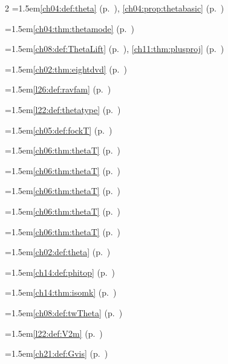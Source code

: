 \begin{multicols}{2}
\hangindent=1.5em\quad \ref{ch04:def:theta} (p.~\pageref{ch04:def:theta}), \ref{ch04:prop:thetabasic} (p.~\pageref{ch04:prop:thetabasic})\par
\hangindent=1.5em\quad \ref{ch04:thm:thetamode} (p.~\pageref{ch04:thm:thetamode})\par
\hangindent=1.5em\quad \ref{ch08:def:ThetaLift} (p.~\pageref{ch08:def:ThetaLift}), \ref{ch11:thm:plusproj} (p.~\pageref{ch11:thm:plusproj})\par
\hangindent=1.5em\quad \ref{ch02:thm:eightdvd} (p.~\pageref{ch02:thm:eightdvd})\par
\hangindent=1.5em\quad \ref{l26:def:ravfam} (p.~\pageref{l26:def:ravfam})\par
\hangindent=1.5em\quad \ref{l22:def:thetatype} (p.~\pageref{l22:def:thetatype})\par
\hangindent=1.5em\quad \ref{ch05:def:fockT} (p.~\pageref{ch05:def:fockT})\par
\hangindent=1.5em\quad \ref{ch06:thm:thetaT} (p.~\pageref{ch06:thm:thetaT})\par
\hangindent=1.5em\quad \ref{ch06:thm:thetaT} (p.~\pageref{ch06:thm:thetaT})\par
\hangindent=1.5em\quad \ref{ch06:thm:thetaT} (p.~\pageref{ch06:thm:thetaT})\par
\hangindent=1.5em\quad \ref{ch06:thm:thetaT} (p.~\pageref{ch06:thm:thetaT})\par
\hangindent=1.5em\quad \ref{ch06:thm:thetaT} (p.~\pageref{ch06:thm:thetaT})\par
\hangindent=1.5em\quad \ref{ch02:def:theta} (p.~\pageref{ch02:def:theta})\par
\hangindent=1.5em\quad \ref{ch14:def:phitop} (p.~\pageref{ch14:def:phitop})\par
\hangindent=1.5em\quad \ref{ch14:thm:isomk} (p.~\pageref{ch14:thm:isomk})\par
\hangindent=1.5em\quad \ref{ch08:def:twTheta} (p.~\pageref{ch08:def:twTheta})\par
\hangindent=1.5em\quad \ref{l22:def:V2m} (p.~\pageref{l22:def:V2m})\par
\hangindent=1.5em\quad \ref{ch21:def:Gvis} (p.~\pageref{ch21:def:Gvis})\par

\end{multicols}
